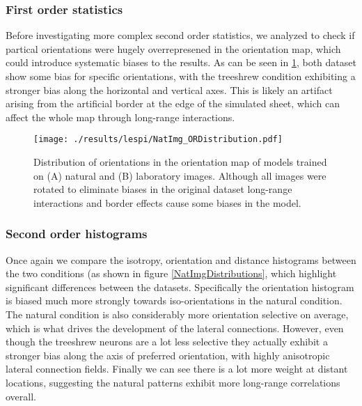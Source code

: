 \subsubsection{First order statistics}

Before investigating more complex second order statistics, we analyzed
to check if partical orientations were hugely overrepresened in the
orientation map, which could introduce systematic biases to the
results. As can be seen in \ref{NatImgORs}, both dataset show some
bias for specific orientations, with the treeshrew condition
exhibiting a stronger bias along the horizontal and vertical
axes. This is likely an artifact arising from the artificial border at
the edge of the simulated sheet, which can affect the whole map
through long-range interactions.

\begin{figure}
	\centering
    \texttt{[image: ./results/lespi/NatImg\_ORDistribution.pdf]}
	\caption[Distribution of orientations in the orientation map of
      models trained on natural and laboratory images.]{Distribution
      of orientations in the orientation map of models trained on (A)
      natural and (B) laboratory images. Although all images were
      rotated to eliminate biases in the original dataset long-range
      interactions and border effects cause some biases in the model.}
	\label{NatImgORs}
\end{figure}

\subsubsection{Second order histograms}

Once again we compare the isotropy, orientation and distance
histograms between the two conditions (as shown in figure
\ref{NatImgDistributions}, which highlight significant differences
between the datasets. Specifically the orientation histogram is biased
much more strongly towards iso-orientations in the natural
condition. The natural condition is also considerably more orientation
selective on average, which is what drives the development of the
lateral connections. However, even though the treeshrew neurons are a
lot less selective they actually exhibit a stronger bias along the
axis of preferred orientation, with highly anisotropic lateral
connection fields. Finally we can see there is a lot more weight at
distant locations, suggesting the natural patterns exhibit more
long-range correlations overall.

